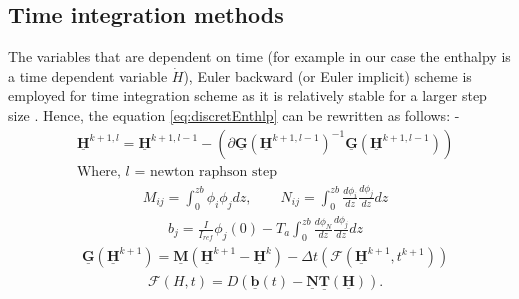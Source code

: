 \subsection{Time integration methods\label{sec:overviewsuba}}
The variables that are dependent on time (for example in our case the enthalpy is a time dependent variable $\Dot{H}$), Euler backward (or Euler implicit) scheme \cite{butcher2016numerical} is employed for time integration scheme as it is relatively stable for a larger step size \cite{Stuart:2022}. Hence, the equation \eqref{eq:discretEnthlp} can be rewritten as follows: -\\
\begin{subequations}
\begin{align}
&\underline{\mathbf{H}}^{k+1,l} = \underline{\mathbf{H}}^{k+1,l-1} - (\partial{\underline{\mathbf{G}}(\underline{\mathbf{H}}^{k+1,l-1})}^{-1}\underline{\mathbf{G}}(\underline{\mathbf{H}}^{k+1,l-1})) \\
&\text{Where, $l$ = newton raphson step} \nonumber
\end{align}
\end{subequations}
\begin{subequations}
\begin{align}
&M_{ij} = \int_0^{zb} \phi_i \phi_j dz,\quad \quad N_{ij} = \int_0^{zb} \frac{d\phi_i}{dz}\frac{d\phi_j}{dz}  dz \label{eq:Descritized_form_mass_matrix}
\end{align}
\end{subequations}
\begin{subequations}
\begin{align}
&b_j = \frac{I}{I_{ref}}\phi_j(0)-T_a\int_0^{zb}\frac{d\phi_N}{dz}\frac{d\phi_j}{dz}  dz \label{eq:Descritised_b_matrix}
\end{align}
\end{subequations}
\begin{subequations}
\begin{align}
&\underline{\mathbf{G}}(\underline{\mathbf{H}}^{k+1}) = \underline{\mathbf{M}}(\underline{\mathbf{H}}^{k+1} - \underline{\mathbf{H}}^{k}) - \Delta t(\mathcal{F}(\underline{\mathbf{H}}^{k+1}, t^{k+1})) \label{eq:Descritised_G_matrix}
\end{align}
\end{subequations}
\begin{subequations}
\begin{align}
&\mathcal{F}(H,t) = D(\underline{\mathbf{b}}(t)-\underline{\mathbf{N}}\underline{\mathbf{T}}(\underline{\mathbf{H}})).
\end{align}
\end{subequations}
